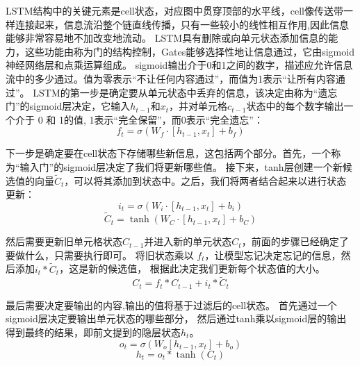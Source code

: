 LSTM结构中的关键元素是cell状态，对应图中贯穿顶部的水平线，cell像传送带一样连接起来，信息流沿整个链直线传播，只有一些较小的线性相互作用,因此信息能够非常容易地不加改变地流动。
LSTM具有删除或向单元状态添加信息的能力，这些功能由称为门的结构控制，Gates能够选择性地让信息通过，它由sigmoid神经网络层和点乘运算组成。
sigmoid输出介于0和1之间的数字，描述应允许信息流中的多少通过。值为零表示“不让任何内容通过”，而值为1表示“让所有内容通过”。
LSTM的第一步是确定要从单元状态中丢弃的信息，该决定由称为“遗忘门”的sigmoid层决定，它输入$h_{t-1}$和$x_{t}$，并对单元格$c_{t-1}$状态中的每个数字输出一个介于 0 和 1的值,
1表示“完全保留”，而0表示“完全遗忘”：
\begin{equation}
  f_{t}=σ(W_{f}\cdot[h_{t-1},x_t]+b_{f})
  \end{equation}

  下一步是确定要在cell状态下存储哪些新信息，这包括两个部分。首先，一个称为“输入门”的sigmoid层决定了我们将更新哪些值。
  接下来，tanh层创建一个新候选值的向量$\tilde{C}_{t}$，可以将其添加到状态中。之后，我们将两者结合起来以进行状态更新：
  \begin{equation}
    i_{t} =\sigma\left(W_{i} \cdot\left[h_{t-1}, x_{t}\right]+b_{i}\right) 
  \end{equation}  
    \begin{equation}
      \tilde{C}_{t} =\tanh \left(W_{C} \cdot\left[h_{t-1}, x_{t}\right]+b_{C}\right)
      \end{equation}   

然后需要更新旧单元格状态$C_{t-1}$并进入新的单元状态$C_{t}$，前面的步骤已经确定了要做什么，只需要执行即可。
将旧状态乘以 $f_{t}$，让模型忘记决定忘记的信息，然后添加$i_{t} * \tilde{C}_{t}$，这是新的候选值，
根据此决定我们更新每个状态值的大小。
\begin{equation}
C_{t}=f_{t} * C_{t-1}+i_{t} * \tilde{C}_{t}
\end{equation} 

最后需要决定要输出的内容,输出的值将基于过滤后的cell状态。
首先通过一个sigmoid层决定要输出单元状态的哪些部分，
然后通过tanh乘以sigmoid层的输出得到最终的结果，即前文提到的隐层状态$h_{t}$。
\begin{equation}
  o_{t}=\sigma\left(W_{o}\left[h_{t-1}, x_{t}\right]+b_{o}\right)
\end{equation} 
\begin{equation}
  h_{t}=o_{t} * \tanh \left(C_{t}\right)
\end{equation}


